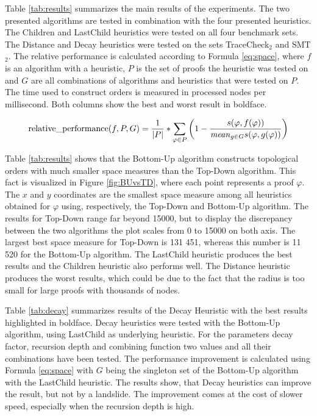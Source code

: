 Table \ref{tab:results} summarizes the main results of the experiments.
The two presented algorithms are tested in combination with the four presented heuristics.
The Children and LastChild heuristics were tested on all four benchmark sets.
The Distance and Decay heuristics were tested on the sets TraceCheck$_2$ and SMT$_2$.
The relative performance is calculated according to Formula \ref{eq:space}, where $f$ is an algorithm with a heuristic, $P$ is the set of proofs the heuristic was tested on and $G$ are all combinations of algorithms and heuristics that were tested on $P$.
The time used to construct orders is measured in processed nodes per millisecond.
Both columns show the best and worst result in boldface.

\begin{align}
  \operatorname{relative\_performance}(f,P,G) = \frac{1}{|P|} * \sum_{\varphi \in P}{\left( 1 -
    \frac{
      s(\varphi,f(\varphi))
    }{
        \mathit{mean}_{g\in G}{s(\varphi,g(\varphi))}
    } \right)
  }
  \label{eq:space}
\end{align}

Table \ref{tab:results} shows that the Bottom-Up algorithm constructs topological orders with much smaller space measures than the Top-Down algorithm. 
This fact is visualized in Figure \ref{fig:BUvsTD}, where each point represents a proof $\varphi$.
The $x$ and $y$ coordinates are the smallest space measure among all heuristics obtained for $\varphi$ using, respectively, the Top-Down and Bottom-Up algorithm.
The results for Top-Down range far beyond 15000, but to display the discrepancy between the two algorithms the plot scales from 0 to 15000 on both axis.
The largest best space measure for Top-Down is 131 451, whereas this number is 11 520 for the Bottom-Up algorithm.
The LastChild heuristic produces the best results and the Children heuristic also performs well.
The Distance heuristic produces the worst results, which could be due to the fact that the radius is too small for large proofs with thousands of  nodes.

Table \ref{tab:decay} summarizes results of the Decay Heuristic with the best results highlighted in boldface.
Decay heuristics were tested with the Bottom-Up algorithm, using LastChild as underlying heuristic.
For the parameters decay factor, recursion depth and combining function two values and all their combinations have been tested.
The performance improvement is calculated using Formula \ref{eq:space} with $G$ being the singleton set of the Bottom-Up algorithm with the LastChild heuristic.
The results show, that Decay heuristics can improve the result, but not by a landslide.
The improvement comes at the cost of slower speed, especially when the recursion depth is high.

